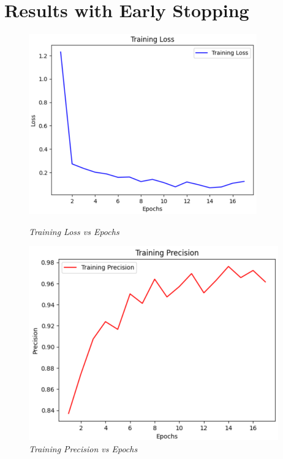 \documentclass[12pt, a4paper]{report}
\begin{document}
\section{Results with Early Stopping}
\begin{figure}[htbp]
    \centering
    \begin{minipage}{0.4\textwidth}
        \centering
        \includegraphics[width=\linewidth]{report images/image30.png}
        \caption{\textit{Training Loss vs Epochs}}
    \end{minipage}%
    \hspace{0.05\textwidth} %
    \begin{minipage}{0.4\textwidth}
        \centering
        \includegraphics[width=\linewidth]{report images/image31.png}
        \caption{\textit{Training Precision vs Epochs}}
    \end{minipage}
\end{figure}
\end{document}
